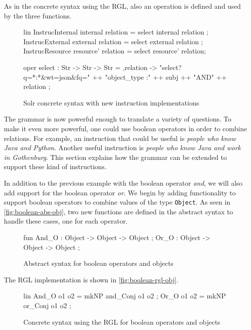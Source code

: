 As in the concrete syntax using the RGL, also an operation is defined and used by the three functions.

\begin{figure}[H]
\begin{code}
lin
  InstrucInternal internal relation = select internal relation ;
  InstrucExternal external relation = select external relation ;
  InstrucResource resource' relation = select resource' relation;

oper
  select : Str -> Str -> Str = \subj,relation -> 
                    "select?q=*:*&wt=json&fq=" ++ "object_type :" 
                    ++ subj ++ "AND" ++ relation ;
\end{code}
\caption{Solr concrete syntax with new instruction implementations\label{fig:solr-new-instructions}}
\end{figure}

The grammar is now powerful enough to translate a variety of questions. To make it even more powerful, one could use boolean operators in order to combine relations. For example, an instruction that could be useful is \emph{people who know Java and Python}. Another useful instruction is \emph{people who know Java and work in Gothenburg}. This section explains how the grammar can be extended to support these kind of instructions.

In addition to the previous example with the boolean operator \emph{and}, we will also add support for the boolean operator \emph{or}. We begin by adding functionality to support boolean operators to combine values of the type \texttt{Object}. As seen in \autoref{fig:boolean-abs-obj}, two new functions are defined in the abstract syntax to handle these cases, one for each operator.

\begin{figure}[H]
\begin{code}
fun
  And_O : Object -> Object -> Object ;
  Or_O : Object -> Object -> Object ;
\end{code}
\caption{Abstract syntax for boolean operators and objects\label{fig:boolean-abs-obj}}
\end{figure}

The RGL implementation is shown in \autoref{fig:boolean-rgl-obj}.

\begin{figure}[H]
\begin{code}
lin
  And_O o1 o2 = mkNP and_Conj o1 o2 ;
  Or_O o1 o2 = mkNP or_Conj o1 o2 ;
\end{code}
\caption{Concrete syntax using the RGL for boolean operators and objects\label{fig:boolean-rgl-obj}}
\end{figure}

